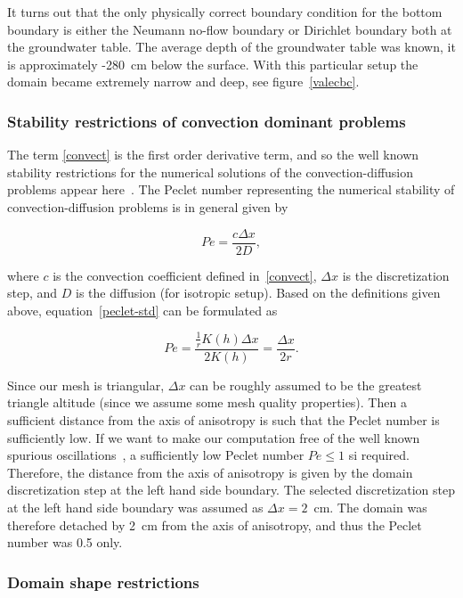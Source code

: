 \documentclass[review]{elsarticle}
\newenvironment{lineq}
    {\begin{linenomath*}
    \begin{equation}
    }
    { 
    \end{equation} 
    \end{linenomath*}
    }
\begin{document}
It turns out that the only physically correct boundary condition for the bottom boundary is either the Neumann no-flow boundary or Dirichlet boundary both at the groundwater table. The average depth of the groundwater table was known, it is approximately -280~cm below the surface. With this particular setup the domain became extremely narrow and deep, see figure~\ref{valecbc}.

\subsubsection{Stability restrictions of convection dominant problems}
\label{restrconvect}

The term \eqref{convect} is the first order derivative term, and so the well known stability restrictions for the numerical solutions of the convection-diffusion problems appear here~\cite{zienkiewicz1976}.
The Peclet number representing the numerical stability of convection-diffusion problems is in general given by~\cite{knobloch2008}
\begin{lineq}
\label{peclet-std}
Pe = \frac{c \Delta x}{2 D},
\end{lineq}
where $c$ is the convection coefficient defined in~\eqref{convect}, $\Delta x$ is the discretization step, and $D$ is the diffusion (for isotropic setup). Based on the definitions given above, equation~\eqref{peclet-std} can be formulated as
\begin{lineq}
Pe =  \frac{\frac{1}{r}K(h) \Delta x}{2K(h)} = \frac{\Delta x}{2r}.
\end{lineq}
Since our mesh is triangular, $\Delta x$ can be roughly assumed to be the greatest triangle altitude (since we assume some mesh quality properties). Then a sufficient distance from the axis of anisotropy is such that the Peclet number is sufficiently low. If we want to make our computation free of the well known spurious oscillations~\cite{zienkiewicz1976, roos-layers}, a sufficiently low Peclet number $Pe\le 1$ si required. Therefore, the distance from the axis of anisotropy is given by the domain discretization step at the left hand side boundary. The selected discretization step at the left hand side boundary was assumed as $\Delta x=2$~cm. The domain was therefore detached by 2~cm from the axis of anisotropy, and thus the Peclet number was 0.5 only.


\subsubsection{Domain shape restrictions}
\end{document}
